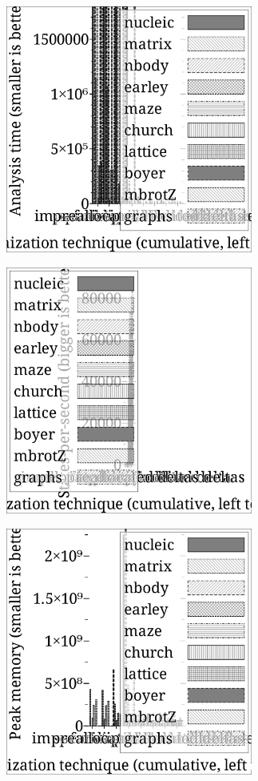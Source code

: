 \documentclass[preprint,onecolumn,9pt]{sigplanconf} %
\begin{document}
\begin{figure}
\begin{center}
\includegraphics[width=3.2in]{abs-time.ps}
\end{center}
\end{figure}

\begin{figure}
\begin{center}
\includegraphics[width=3.2in]{state-per-sec.ps}
\end{center}
\end{figure}

\begin{figure}
\begin{center}
\includegraphics[width=3.2in]{peak-mem.ps}
\end{center}
\end{figure}
\end{document}
